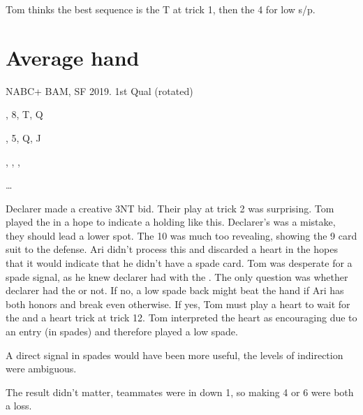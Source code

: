 \documentclass[tom-ari]{subfiles}
\begin{document}
Tom thinks the best sequence is the T at trick 1, then the 4 for low s/p. 

\section{Average hand}

NABC+ BAM, SF 2019.  1st Qual (rotated)

\begin{handdiagram}
\end{handdiagram}	


, 8, T, Q

, 5, Q, J

, , , 

 \ldots

Declarer made a creative 3NT bid. Their play at trick 2 was surprising. Tom played the  in a hope to indicate a holding like this. Declarer's  was a mistake, they should lead a lower spot. The 10 was much  too revealing, showing the 9 card suit to the defense. Ari didn't process this and discarded a heart in the hopes that it would indicate that he didn't have a spade card. Tom was desperate for a spade signal, as he knew declarer had  with the . The only question was whether declarer had the  or not. If no, a low spade back might beat the hand if Ari has both honors and break even otherwise. If yes, Tom must play a heart to wait for the  and a heart trick at trick 12. Tom interpreted the heart as encouraging due to an entry (in spades) and therefore played a low spade.

A direct signal in spades would have been more useful, the levels of indirection were ambiguous.

The result didn't matter, teammates were in  down 1, so making 4 or 6 were both a loss.
\end{document}
